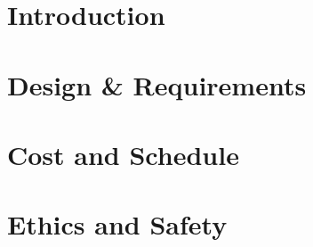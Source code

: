 \documentclass[12pt]{article}
\begin{document}

\clearpage
\section{Introduction}
\section{Design \& Requirements}
\section{Cost and Schedule}
\section{Ethics and Safety}

\printbibliography
\end{document}
